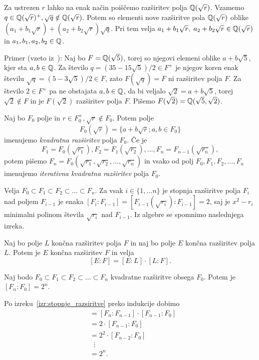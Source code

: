 Za ustrezen $r$ lahko na enak način poiščemo razširitev polja $\mathbb Q(\sqrt{r})$. Vzamemo $q \in \mathbb Q(\sqrt{r})^+, \sqrt{q} \notin \mathbb Q(\sqrt{r})$. Potem so elementi nove razširitve pola $\mathbb Q(\sqrt{r})$ oblike $(a_1 + b_1\sqrt{r}) + (a_2 + b_2\sqrt{r})\sqrt{q}$. Pri tem velja $a_1 + b_1\sqrt{r}, \; a_2 + b_2\sqrt{r} \in \mathbb Q(\sqrt{r})$ in $a_1, b_1, a_2, b_2 \in \mathbb Q$.

Primer (vzeto iz~\cite[str.\ 36]{geometricconstructions}): Naj bo $F = \mathbb Q(\sqrt{5})$, torej so njegovi elemeni oblike $a + b\sqrt{5}$, kjer sta $a, b \in \mathbb Q$. Za število $q = (35-15\sqrt{5})/2 \in F^+$ je njegov koren enak številu $\sqrt{q} = (5-3\sqrt{5})/2 \in F$, zato $F(\sqrt{q}) = F$ ni razširitev polja $F$. Za število $2 \in F^+$ pa ne obstajata $a, b \in \mathbb Q$, da bi veljalo $\sqrt{2} = a+b\sqrt{5}$, torej $\sqrt{2} \notin F$ in je $F(\sqrt{2})$ razširitev polja $F$. Pišemo $F(\sqrt{2}) = \mathbb Q(\sqrt{5}, \sqrt{2})$. 

\begin{definicija}
    \label{def:kvad_razs}
    Naj bo $F_0$ polje in $r \in F_0^+, \sqrt{r} \notin F_0$. Potem polje
    $$ F_0(\sqrt{r}) = \{a+b\sqrt{r}; a,b \in F_0\} $$
    imenujemo \emph{kvadratna razširitev} polja $F_0$. Če je
    $$ F_1 = F_0(\sqrt{r_1}), F_2 = F_1(\sqrt{r_2}), \ldots, F_n = F_{n-1}(\sqrt{r_n}), $$
    potem pišemo $F_n = F_0(\sqrt{r_1}, \sqrt{r_2}, \ldots, \sqrt{r_n})$ in vsako od polj $F_0, F_1, F_2, \ldots, F_n$ imenujemo \emph{iterativna kvadratna razširitev} polja $F_0$.
\end{definicija}


Velja $F_0 \subset F_1 \subset F_2 \subset \ldots \subset F_n$. Za vsak $i \in \{1, \ldots n\}$ je stopnja razširitve polja $F_i$ nad poljem $F_{i-1}$ je enaka $[F_i : F_{i-1}] = [F_{i-1}(\sqrt{r_{i}}) : F_{i-1}] = 2$, saj je $x^2 - r_{i}$ minimalni polinom števila $\sqrt{r_{i}}$ nad $F_{i-1}$. Iz algebre se spomnimo naslednjega izreka.

\begin{izrek}
    \label{izr:stopnje_razsiritve}
    Naj bo polje $L$ končna razširitev polja $F$ in naj bo polje $E$ končna razširitev polja $L$. Potem je $E$ končna razširitev $F$ in velja
    $$ [E : F] = [E : L] \cdot[L : F].$$
\end{izrek}
\begin{posledica}
    Naj bodo $F_0 \subset F_1 \subset F_2 \subset \ldots \subset F_n$ kvadratne razširitve obsega $F_0$. Potem je $[F_n : F_0] = 2^n$.
\end{posledica}
\begin{dokaz}
    Po izreku~\ref{izr:stopnje_razsiritve} preko indukcije dobimo
    \begin{align*}
        [F_n : F_0] &= [F_n : F_{n-1}] \cdot [F_{n-1} : F_0] \\
        &= 2 \cdot [F_{n-1} : F_0] \\
        &= 2^2 \cdot [F_{n-2} : F_0] \\
        & \; \; \vdots \\
        &= 2^n.
    \end{align*}
\end{dokaz}

